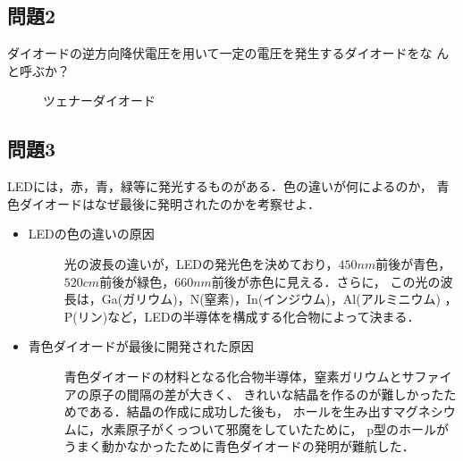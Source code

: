 \subsection*{問題2}
ダイオードの逆方向降伏電圧を用いて一定の電圧を発生するダイオードをな
んと呼ぶか？
\begin{description}
    \item[] ツェナーダイオード
\end{description}

\subsection*{問題3}
LEDには，赤，青，緑等に発光するものがある．色の違いが何によるのか，
青色ダイオードはなぜ最後に発明されたのかを考察せよ．
\begin{itemize}
    \item LEDの色の違いの原因
    \begin{description}
        \item[] 光の波長の違いが，LEDの発光色を決めており，$450\si{nm}$前後が青色，
        $520\si{cm}$前後が緑色，$660\si{nm}$前後が赤色に見える．さらに，
        この光の波長は，Ga(ガリウム)，N(窒素)，In(インジウム)，Al(アルミニウム)
        ，P(リン)など，LEDの半導体を構成する化合物によって決まる．

    \end{description}
    \item 青色ダイオードが最後に開発された原因
    \begin{description}
        \item[] 青色ダイオードの材料となる化合物半導体，窒素ガリウムとサファイアの原子の間隔の差が大きく、
        きれいな結晶を作るのが難しかったためである．結晶の作成に成功した後も，
        ホールを生み出すマグネシウムに，水素原子がくっついて邪魔をしていたために，
        p型のホールがうまく動かなかったために青色ダイオードの発明が難航した．
    \end{description}
\end{itemize}
